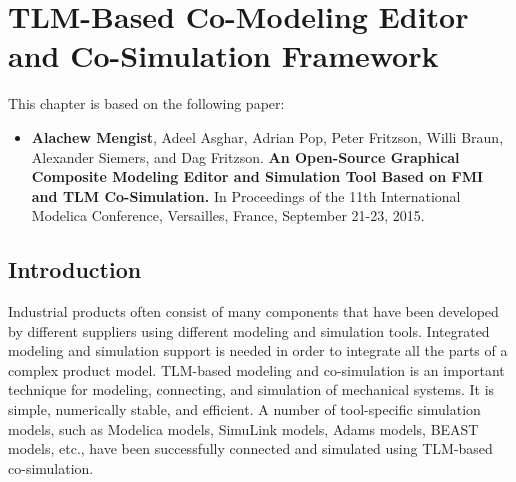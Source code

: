 

\chapter{TLM-Based Co-Modeling Editor and Co-Simulation Framework}
\label{cha:tlm}


This chapter is based on the following paper:

\begin{itemize}
	
	
	\item  \textbf{Alachew Mengist}, Adeel Asghar, Adrian Pop, Peter Fritzson, Willi Braun, Alexander Siemers, and Dag Fritzson.\textbf{ An Open-Source Graphical Composite Modeling Editor and Simulation Tool Based on FMI and TLM Co-Simulation.} In Proceedings of the 11th International Modelica Conference, Versailles, France, September 21-23, 2015. 
	
\end{itemize}

\section{Introduction}
\label{sec:tlmintroduction}

Industrial products often consist of many components that have been developed by different suppliers
using different modeling and simulation tools. Integrated modeling and simulation support is needed in order to
integrate all the parts of a complex product model. TLM-based modeling and co-simulation is an important technique for
modeling, connecting, and simulation of mechanical systems. It is simple, numerically stable, and efficient.
A number of tool-specific simulation models, such as Modelica models, SimuLink models, Adams models, BEAST models, etc., 
have been successfully connected and simulated using TLM-based co-simulation.

